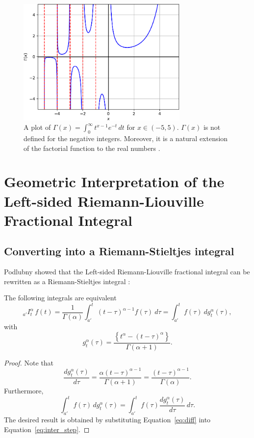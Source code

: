 \documentclass[twoside,reqno,11pt]{fcaa-var} %
\begin{document}
\begin{figure}[htb]
\centering
\includegraphics[width=0.75\textwidth]{gamma.pdf}
\caption{A plot of $\Gamma(x) = \int_0^{\infty} t^{x-1} e^{-t}\,dt$ for $x\in(-5,5)$. $\Gamma(x)$ is not defined for the negative integers. Moreover, it is a natural extension of the factorial function to the real numbers \cite{euler1738}.}
\label{fig:gamma}
\end{figure}

\section{Geometric Interpretation of the Left-sided Riemann-Liouville Fractional Integral}

\subsection{Converting into a Riemann-Stieltjes integral}
Podlubny showed that the Left-sided Riemann-Liouville fractional integral can be rewritten as a Riemann-Stieltjes integral \cite{podlubny02}:
\begin{theorem}
The following integrals are equivalent
\begin{equation}
_{a'}I_t^{\alpha}\,f(t) = \frac{1}{\Gamma(\alpha)}\int_{a'}^{t}(t-\tau)^{\alpha-1}f(\tau)~d\tau = \int_{a'}^{t} f(\tau)~dg_t^{\alpha}(\tau), 
\end{equation}
with 
\begin{equation}
\label{eq:g_rl}
g_t^{\alpha}(\tau) = \frac{\left \{t^{\alpha} - (t-\tau)^{\alpha} \right \}}{\Gamma(\alpha+1)}. 
\end{equation}
\end{theorem}

\begin{proof}
Note that 
\begin{equation}
\label{eq:diff}
\frac{dg_t^{\alpha}(\tau)}{d\tau} = \frac{\alpha(t-\tau)^{\alpha-1}}{\Gamma(\alpha+1)} =\frac{(t-\tau)^{\alpha-1}}{\Gamma(\alpha)}. 
\end{equation}
Furthermore,
\begin{equation}
\label{eq:inter_step}
\int_{a'}^{t} f(\tau)\,dg_t^{\alpha}(\tau) = \int_{a'}^{t} f(\tau) \frac{dg_t^{\alpha}(\tau)}{d\tau}\,d\tau. 
\end{equation}
The desired result is obtained by substituting Equation~\eqref{eq:diff} into Equation~\eqref{eq:inter_step}.  
\end{proof}
\end{document}
